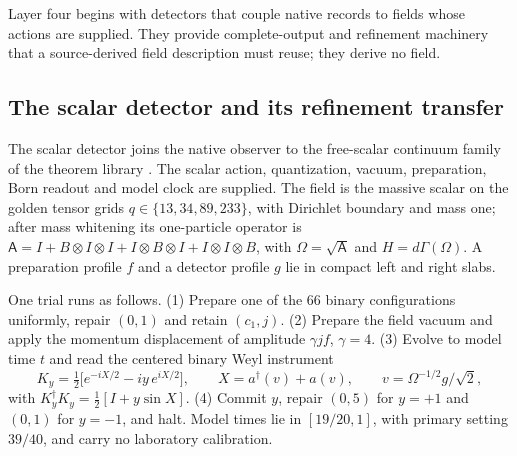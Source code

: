 \documentclass[11pt]{article}
\theoremstyle{definition}
\theoremstyle{remark}
\theoremstyle{plain}
\begin{document}
Layer four begins with detectors that couple native records to fields whose
actions are supplied. They provide complete-output and refinement machinery
that a source-derived field description must reuse; they derive no field.

\subsection{The scalar detector and its refinement transfer}
\label{sec:scalar}

The scalar detector joins the native observer to the free-scalar continuum
family of the theorem library \cite{sREADME,sDERIV}. The scalar action,
quantization, vacuum, preparation, Born readout and model clock are
supplied. The field is the massive scalar on the golden tensor grids
$q\in\{13,34,89,233\}$, with Dirichlet boundary and mass one; after mass
whitening its one-particle operator is
$\mathsf A=I+B\otimes I\otimes I+I\otimes B\otimes I+I\otimes I\otimes B$,
with $\Omega=\sqrt{\mathsf A}$ and $H=d\Gamma(\Omega)$. A preparation profile
$f$ and a detector profile $g$ lie in compact left and right slabs.

One trial runs as follows. (1) Prepare one of the 66 binary configurations
uniformly, repair $(0,1)$ and retain $(c_1,j)$. (2) Prepare the field vacuum
and apply the momentum displacement of amplitude $\gamma jf$, $\gamma=4$.
(3) Evolve to model time $t$ and read the centered binary Weyl instrument
\[
K_y=\tfrac12\bigl[e^{-iX/2}-iy\,e^{iX/2}\bigr],\qquad
X=a^\dagger(v)+a(v),\qquad v=\Omega^{-1/2}g/\sqrt2,
\]
with $K_y^\dagger K_y=\frac12[I+y\sin X]$. (4) Commit $y$, repair $(0,5)$ for
$y=+1$ and $(0,1)$ for $y=-1$, and halt. Model times lie in $[19/20,1]$,
with primary setting $39/40$, and carry no laboratory calibration.
\end{document}
